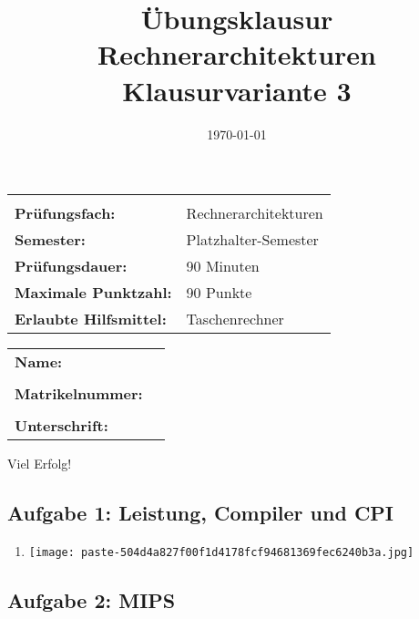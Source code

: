 \documentclass[12pt,a4paper]{article}
\title{Übungsklausur Rechnerarchitekturen \\ \large Klausurvariante 3}
\author{}
\date{\today}
\begin{document}
\begin{titlepage}
    \maketitle
    \vspace{0.5cm}
    \centering
    \begin{tabularx}{0.9\textwidth}{lX}
        \hline\hline \\
        \textbf{Prüfungsfach:} & Rechnerarchitekturen \\
        \textbf{Semester:} & Platzhalter-Semester \\
        \textbf{Prüfungsdauer:} & 90 Minuten \\
        \textbf{Maximale Punktzahl:} & 90 Punkte \\
        \textbf{Erlaubte Hilfsmittel:} & Taschenrechner \\
        \hline\hline
    \end{tabularx}
    \vspace{2.5cm}
    \begin{tabularx}{0.9\textwidth}{lX}
        \textbf{Name:} & \dotfill \\
        \\
        \textbf{Matrikelnummer:} & \dotfill \\
        \\
        \textbf{Unterschrift:} & \dotfill \\
    \end{tabularx}
    \vfill
    {\Large Viel Erfolg!}
\end{titlepage}
\clearpage
\subsection*{Aufgabe 1: Leistung, Compiler und CPI}

\begin{enumerate}[label=\alph*), topsep=5pt, itemsep=10pt]
\item \mbox{}\begin{center}\texttt{[image: paste-504d4a827f00f1d4178fcf94681369fec6240b3a.jpg]}
\end{center}
\end{enumerate}
\clearpage
\subsection*{Aufgabe 2: MIPS}
\end{document}
